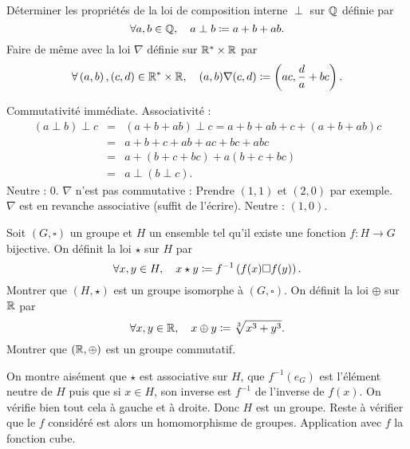 \documentclass{magnolia}
\begin{document}


\begin{questions}
\question Déterminer les propriétés de la loi de composition interne $\perp$
  sur $\mathbb{Q}$ définie par
  \[\forall a,b\in\mathbb{Q} ,\quad a\perp b\coloneqq a+b+ab.\]
\question Faire de même avec la loi $\nabla$ définie sur  ${\mathbb{R}^*}\times\mathbb{R}$ par
  \[\forall \left(a,b\right),\left(c,d\right)\in{\mathbb{R}^*}\times\mathbb{R} ,\quad
    (a,b)\nabla(c,d)\coloneqq\left(ac,\frac{d}{a}+bc\right).\]
\end{questions}

\begin{sol}
\begin{questions}
\question Commutativité immédiate.
Associativité :
\begin{eqnarray*}
(a\perp b)\perp c&=&(a+b+ab)\perp c=a+b+ab+c+(a+b+ab)c\\
&=&a+b+c+ab+ac+bc+abc\\
&=&a+(b+c+bc)+a(b+c+bc)\\
&=&a\perp (b\perp c).
\end{eqnarray*}
Neutre : 0.
\question $\nabla$ n'est pas commutative : Prendre $(1,1)$ et $(2,0)$ par exemple. \\
$\nabla$ est en revanche associative (suffit de l'écrire).
Neutre : $(1,0)$.
\end{questions}
\end{sol}


\begin{questions}
\question Soit $(G,\square)$ un groupe et $H$ un ensemble tel qu'il existe une
  fonction $f:H\to G$ bijective. On définit la loi $\star$ sur $H$ par
  \[\forall x,y\in H ,\quad x\star y\coloneqq f^{-1}\left(f(x)\square f(y)\right).\]
  Montrer que $(H,\star)$ est un groupe isomorphe à $(G,\square)$. 
\question On définit la loi $\oplus$ sur $\mathbb{R}$ par
  \[\forall x,y\in\mathbb{R} ,\quad x\oplus y\coloneqq\sqrt[3]{x^3+y^3}.\]
  Montrer que $(\mathbb{R},\oplus)$ est un groupe commutatif.
\end{questions}
\begin{sol}
\begin{questions}
\question On montre aisément que $\star$ est associative sur $H$, que $f^{-1}(e_G)$ est l'élément neutre de $H$ puis que si $x\in H$, son inverse est $f^{-1}$ de l'inverse de $f(x)$. On vérifie bien tout cela à gauche et à droite. Donc $H$ est un groupe. Reste à vérifier que le $f$ considéré est alors un homomorphisme de groupes.
\question Application avec $f$ la fonction cube.
\end{questions}
\end{sol}
\end{document}
